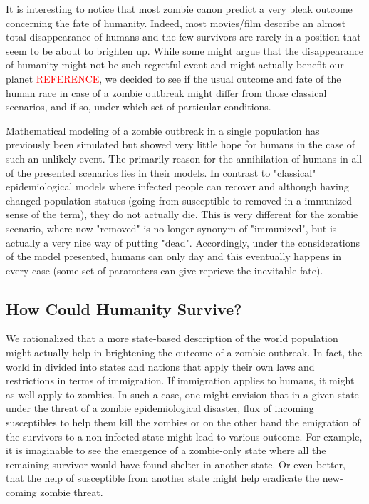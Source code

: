 \documentclass[11pt]{article} %
\begin{document}
It is interesting to notice that most zombie canon predict a very bleak outcome concerning the fate of humanity. Indeed, most movies/film describe an almost total disappearance of humans and the few survivors are rarely in a position that seem to be about to brighten up. While some might argue that the disappearance of humanity might not be such regretful event and might actually benefit our planet \textcolor{red}{REFERENCE}, we decided to see if the usual outcome and fate of the human race in case of a zombie outbreak might differ from those classical scenarios, and if so, under which set of particular conditions. 

Mathematical modeling of a zombie outbreak in a single population has previously been simulated \cite{munz2009zombies} but showed very little hope for humans in the case of such an unlikely event. The primarily reason for the annihilation of humans in all of the presented scenarios lies in their models. In contrast to "classical" epidemiological models where infected people can recover and although having changed population statues (going from susceptible to removed in a immunized sense of the term), they do not actually die. This is very different for the zombie scenario, where now "removed" is no longer synonym of "immunized", but is actually a very nice way of putting "dead". Accordingly, under the considerations of the model presented, humans can only day and this eventually happens in every case (some set of parameters can give reprieve the inevitable fate).\\

\subsection{How Could Humanity Survive?}\indent

We rationalized that a more state-based description of the world population might actually help in brightening the outcome of a zombie outbreak. In fact, the world in divided into states and nations that apply their own laws and restrictions in terms of immigration. If immigration applies to humans, it might as well apply to zombies. In such a case, one might envision that in a given state under the threat of a zombie epidemiological disaster, flux of incoming susceptibles to help them kill the zombies or on the other hand the emigration of the survivors to a non-infected state might lead to various outcome. For example, it is imaginable to see the emergence of a zombie-only state where all the remaining survivor would have found shelter in another state. Or even better, that the help of susceptible from another state might help eradicate the new-coming zombie threat. 
\end{document}
